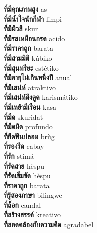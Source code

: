 \textbf{ ที่มีคุณภาพสูง  } as \\
\textbf{ ที่มีน้ำใจนักกีฬา  } limpi \\
\textbf{ ที่มีผิวสี  } skur \\
\textbf{ ที่มีรสเหมือนกรด  } acido \\
\textbf{ ที่มีราคาถูก  } barata \\
\textbf{ ที่มีสามมิติ  } kúbiko \\
\textbf{ ที่มีสุนทรียะ  } estétiko \\
\textbf{ ที่มีอายุไม่เกินหนึ่งปี  } anual \\
\textbf{ ที่มีเสน่ห์  } atraktivo \\
\textbf{ ที่มีเสน่ห์ดึงดูด  } karismátiko \\
\textbf{ ที่มีเหย้ามีเรือน  } kasa \\
\textbf{ ที่มืด  } skuridat \\
\textbf{ ที่มืดมิด  } profundo \\
\textbf{ ที่ยึดฟันปลอม  } brùg \\
\textbf{ ที่รองรีด  } cabay \\
\textbf{ ที่รัก  } stimá \\
\textbf{ ที่รัดสาย  } hèspu \\
\textbf{ ที่รัดเข็มขัด  } hèspu \\
\textbf{ ที่ราคาถูก  } barata \\
\textbf{ ที่รู้สองภาษา  } bilingwe \\
\textbf{ ที่ล็อก  } candal \\
\textbf{ ที่สร้างสรรค์  } kreativo \\
\textbf{ ที่สอดคล้องกับความคิด  } agradabel \\
